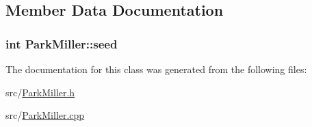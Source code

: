 \subsection{Member Data Documentation}
\hypertarget{classParkMiller_a425ab2a4cf6f25d7749285286b3504d7}{
\subsubsection[{seed}]{\setlength{\rightskip}{0pt plus 5cm}int Park\-Miller\-::seed\hspace{0.3cm}{\ttfamily [protected]}}}\label{classParkMiller_a425ab2a4cf6f25d7749285286b3504d7}


The documentation for this class was generated from the following files\-:\begin{DoxyCompactItemize}
\item 
src/\hyperlink{ParkMiller_8h}{Park\-Miller.\-h}\item 
src/\hyperlink{ParkMiller_8cpp}{Park\-Miller.\-cpp}\end{DoxyCompactItemize}
